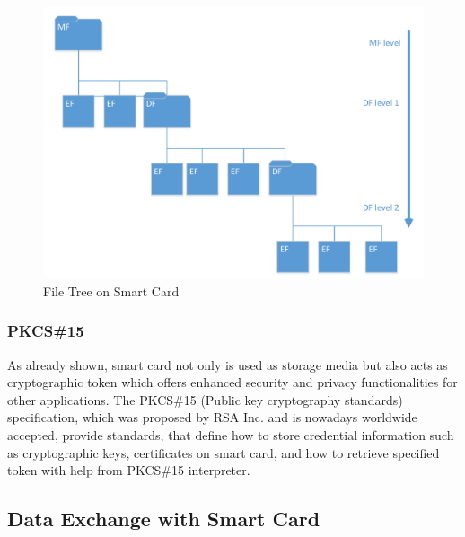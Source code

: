 \begin{figure}[!htbp]
	\centering
	\includegraphics[width=1.0\textwidth]{file-structure}
		\caption{File Tree on Smart Card\cite{handbuch}}
	\label{fig:file-structure}
\end{figure}

\subsubsection{PKCS{\#}15}
As already shown, smart card not only is used as storage media but also acts as cryptographic token which offers enhanced security and privacy functionalities for other applications. The PKCS\#15 (Public key cryptography standards) specification\cite{pkcs}, which was proposed by RSA Inc. and is nowadays worldwide accepted, provide standards, that define how to store credential information such as cryptographic keys, certificates on smart card, and how to retrieve specified token with help from PKCS\#15 interpreter.
 
\subsection{Data Exchange with Smart Card}


